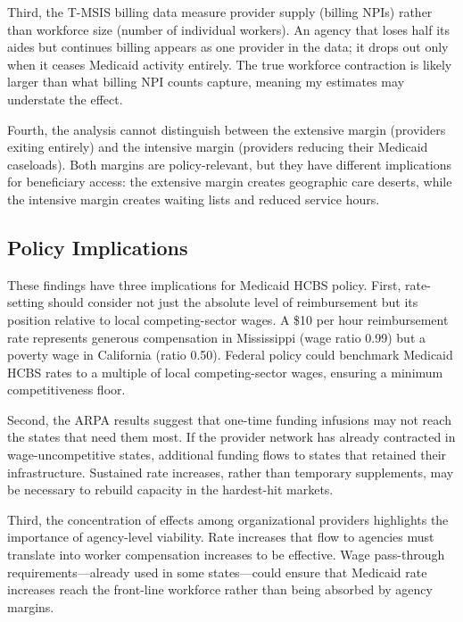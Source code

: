 \documentclass[12pt]{article}
\begin{document}
Third, the T-MSIS billing data measure provider supply (billing NPIs) rather than workforce size (number of individual workers). An agency that loses half its aides but continues billing appears as one provider in the data; it drops out only when it ceases Medicaid activity entirely. The true workforce contraction is likely larger than what billing NPI counts capture, meaning my estimates may understate the effect.

Fourth, the analysis cannot distinguish between the extensive margin (providers exiting entirely) and the intensive margin (providers reducing their Medicaid caseloads). Both margins are policy-relevant, but they have different implications for beneficiary access: the extensive margin creates geographic care deserts, while the intensive margin creates waiting lists and reduced service hours.

\subsection{Policy Implications}

These findings have three implications for Medicaid HCBS policy. First, rate-setting should consider not just the absolute level of reimbursement but its position relative to local competing-sector wages. A \$10 per hour reimbursement rate represents generous compensation in Mississippi (wage ratio 0.99) but a poverty wage in California (ratio 0.50). Federal policy could benchmark Medicaid HCBS rates to a multiple of local competing-sector wages, ensuring a minimum competitiveness floor.

Second, the ARPA results suggest that one-time funding infusions may not reach the states that need them most. If the provider network has already contracted in wage-uncompetitive states, additional funding flows to states that retained their infrastructure. Sustained rate increases, rather than temporary supplements, may be necessary to rebuild capacity in the hardest-hit markets.

Third, the concentration of effects among organizational providers highlights the importance of agency-level viability. Rate increases that flow to agencies must translate into worker compensation increases to be effective. Wage pass-through requirements---already used in some states---could ensure that Medicaid rate increases reach the front-line workforce rather than being absorbed by agency margins.


\end{document}
